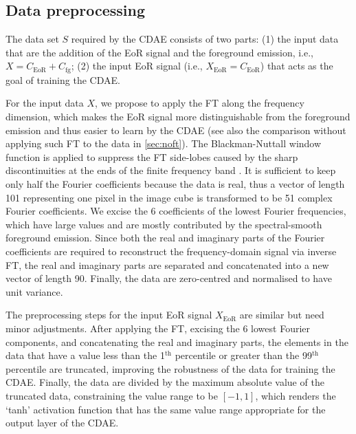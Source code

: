 \documentclass[letters,a4paper,fleqn,usenatbib]{mnras}
\newcommand{\R}[1]{\mathrm{#1}}
\begin{document}
\subsection{Data preprocessing}
\label{sec:preprocessing}

The data set $S$ required by the CDAE consists of two parts:
(1) the input data that are the addition of the EoR signal and the
foreground emission, i.e., $X = C_{\R{EoR}} + C_{\R{fg}}$;
(2) the input EoR signal (i.e., $X_{\R{EoR}} = C_{\R{EoR}}$)
that acts as the goal of training the CDAE.

For the input data $X$, we propose to apply the FT along the frequency
dimension, which makes the EoR signal more distinguishable from the
foreground emission and thus easier to learn by the CDAE (see also the
comparison without applying such FT to the data in \autoref{sec:noft}).
The Blackman-Nuttall window function is applied to suppress the
FT side-lobes caused by the sharp discontinuities at the ends
of the finite frequency band \citep[e.g.,][]{chapman2016}.
It is sufficient to keep only half the Fourier coefficients because
the data is real, thus a vector of length 101 representing one pixel in
the image cube is transformed to be 51 complex Fourier coefficients.
We excise the 6 coefficients of the lowest Fourier frequencies, which
have large values and are mostly contributed by the spectral-smooth
foreground emission.
Since both the real and imaginary parts of the Fourier coefficients
are required to reconstruct the frequency-domain signal via inverse FT,
the real and imaginary parts are separated and concatenated into a new
vector of length 90.
Finally, the data are zero-centred and normalised to have unit variance.

The preprocessing steps for the input EoR signal $X_{\R{EoR}}$ are
similar but need minor adjustments.
After applying the FT, excising the 6 lowest Fourier components, and
concatenating the real and imaginary parts,
the elements in the data that have a value less than the 1$^{\R{th}}$
percentile or greater than the 99$^{\R{th}}$ percentile are truncated,
improving the robustness of the data for training the CDAE.
Finally, the data are divided by the maximum absolute value of the
truncated data, constraining the value range to be $[-1, 1]$,
which renders the `tanh' activation function that has the same value
range appropriate for the output layer of the CDAE.


\end{document}
